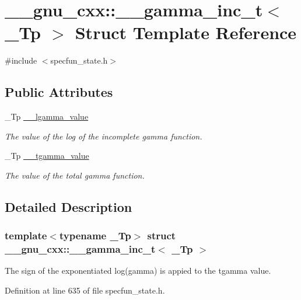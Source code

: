 \hypertarget{struct____gnu__cxx_1_1____gamma__inc__t}{}\section{\+\_\+\+\_\+gnu\+\_\+cxx\+:\+:\+\_\+\+\_\+gamma\+\_\+inc\+\_\+t$<$ \+\_\+\+Tp $>$ Struct Template Reference}
\label{struct____gnu__cxx_1_1____gamma__inc__t}


{\ttfamily \#include $<$specfun\+\_\+state.\+h$>$}

\subsection*{Public Attributes}
\begin{DoxyCompactItemize}
\item 
\+\_\+\+Tp \hyperlink{struct____gnu__cxx_1_1____gamma__inc__t_a193b3f7871e371363571fe90b1ce1767}{\+\_\+\+\_\+lgamma\+\_\+value}
\begin{DoxyCompactList}\small\item\em The value of the log of the incomplete gamma function. \end{DoxyCompactList}\item 
\+\_\+\+Tp \hyperlink{struct____gnu__cxx_1_1____gamma__inc__t_a53d4ffc984c6685ce328caff424b5fe4}{\+\_\+\+\_\+tgamma\+\_\+value}
\begin{DoxyCompactList}\small\item\em The value of the total gamma function. \end{DoxyCompactList}\end{DoxyCompactItemize}


\subsection{Detailed Description}
\subsubsection*{template$<$typename \+\_\+\+Tp$>$\newline
struct \+\_\+\+\_\+gnu\+\_\+cxx\+::\+\_\+\+\_\+gamma\+\_\+inc\+\_\+t$<$ \+\_\+\+Tp $>$}

The sign of the exponentiated log(gamma) is appied to the tgamma value. 

Definition at line 635 of file specfun\+\_\+state.\+h.



